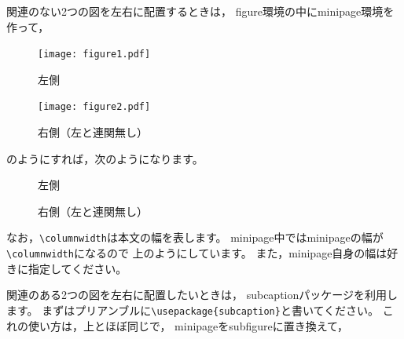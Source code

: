 関連のない2つの図を左右に配置するときは，
figure環境の中にminipage環境を作って，

\begin{ITeX}
\begin{figure}
\begin{center}
\begin{minipage}{0.4\columnwidth}
    \begin{center}
    \texttt{[image: figure1.pdf]}
    \end{center}
    \caption{左側}
    \label{fig:left}
\end{minipage}
\begin{minipage}{0.4\columnwidth}
    \begin{center}
    \texttt{[image: figure2.pdf]}
    \end{center}
    \caption{右側（左と連関無し）}
    \label{fig:right}
\end{minipage}
\end{center}
\end{figure}
\end{ITeX}

のようにすれば，次のようになります。

\begin{figure}[H]
\begin{center}
\begin{minipage}{0.4\columnwidth}
	\begin{center}
	
	\end{center}
	\caption{左側}
	\label{fig:left}
\end{minipage}
\begin{minipage}{0.4\columnwidth}
	\begin{center}
	
	\end{center}
	\caption{右側（左と連関無し）}
	\label{fig:right}
\end{minipage}
\end{center}
\end{figure}

なお，\verb|\columnwidth|は本文の幅を表します。
minipage中ではminipageの幅が\verb|\columnwidth|になるので
上のようにしています。
また，minipage自身の幅は好きに指定してください。

関連のある2つの図を左右に配置したいときは，
subcaptionパッケージを利用します。
まずはプリアンブルに\verb|\usepackage{subcaption}|と書いてください。
これの使い方は，上とほぼ同じで，
minipageをsubfigureに置き換えて，

